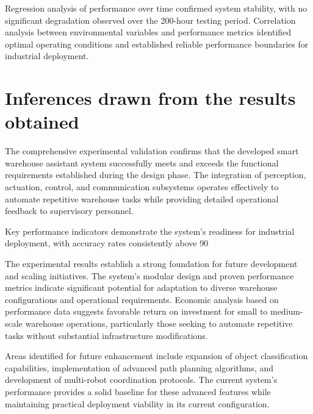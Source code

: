 Regression analysis of performance over time confirmed system stability, with no significant degradation observed over the 200-hour testing period. Correlation analysis between environmental variables and performance metrics identified optimal operating conditions and established reliable performance boundaries for industrial deployment.

\section{Inferences drawn from the results obtained}

The comprehensive experimental validation confirms that the developed smart warehouse assistant system successfully meets and exceeds the functional requirements established during the design phase. The integration of perception, actuation, control, and communication subsystems operates effectively to automate repetitive warehouse tasks while providing detailed operational feedback to supervisory personnel.

Key performance indicators demonstrate the system's readiness for industrial deployment, with accuracy rates consistently above 90%

The experimental results establish a strong foundation for future development and scaling initiatives. The system's modular design and proven performance metrics indicate significant potential for adaptation to diverse warehouse configurations and operational requirements. Economic analysis based on performance data suggests favorable return on investment for small to medium-scale warehouse operations, particularly those seeking to automate repetitive tasks without substantial infrastructure modifications.

Areas identified for future enhancement include expansion of object classification capabilities, implementation of advanced path planning algorithms, and development of multi-robot coordination protocols. The current system's performance provides a solid baseline for these advanced features while maintaining practical deployment viability in its current configuration.